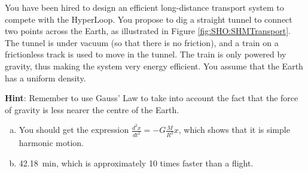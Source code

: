 \question You have been hired to design an efficient long-distance transport system to compete with the HyperLoop. You propose to dig a straight tunnel to connect two points across the Earth, as illustrated in Figure \ref{fig:SHO:SHMTransport}. The tunnel is under vacuum (so that there is no friction), and a train on a frictionless track is used to move in the tunnel. The train is only powered by gravity, thus making the system very energy efficient. You assume that the Earth has a uniform density.
\textbf{Hint}: Remember to use Gauss' Law to take into account the fact that the force of gravity is less nearer the centre of the Earth.
\begin{finalanswer}
\begin{enumerate}[(a)]
\item You should get the expression $\frac{d^2x}{dt^2}=-G\frac{M}{R^3}x$, which shows that it is simple harmonic motion.
\item \SI{42.18}{min}, which is approximately 10 times faster than a flight.
\end{enumerate}
\end{finalanswer}
